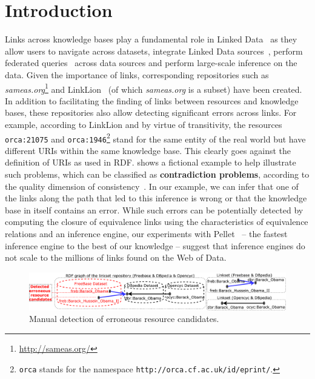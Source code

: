 \section{Introduction}
Links across knowledge bases play a fundamental role in Linked Data~\cite{Albertoni:2013:ALQ:2457317.2457327} as they  allow users to navigate across datasets, integrate Linked Data sources~\cite{NgomoSL14}, perform federated queries~\cite{saleem2013daw} across data sources and perform large-scale inference on the data.
Given the importance of links, corresponding repositories such as \emph{sameas.org}\footnote{\url{http://sameas.org/}} and LinkLion~\cite{nentwig2014linklion} (of which \emph{sameas.org} is a subset) have been created. 
In addition to facilitating the finding of links between  resources and knowledge bases, these repositories also allow detecting significant errors across links. 
For example, according to LinkLion and by virtue of transitivity, the resources \texttt{orca:21075} and \texttt{orca:1946}\footnote{\texttt{orca} stands for the namespace \texttt{http://orca.cf.ac.uk/id/eprint/}.} stand for the same entity of the real world but have different URIs within the same knowledge base. 
This clearly goes against the definition of URIs as used in RDF. 
 shows a fictional example to help illustrate such problems, which can be classified as \textbf{contradiction problems}, according to the quality dimension of consistency~\cite{zaveri2015quality}. 
In our example, we can infer that one of the links along the path that led to this inference is wrong or that the knowledge base in itself contains an error. 
While such errors can be potentially detected by computing the closure of equivalence links using the characteristics of equivalence relations and an inference engine, our experiments with Pellet~\cite{bockbenchmarking} -- the fastest inference engine to the best of our knowledge -- suggest that inference engines do not scale to the millions of links found on the Web of Data. 

\begin{figure}[htb] 
	\centering
	\includegraphics[width=1.0\linewidth]{img/example8.pdf}
	\caption{Manual detection of erroneous resource candidates.}
	\label{fig:example}
\end{figure} 

